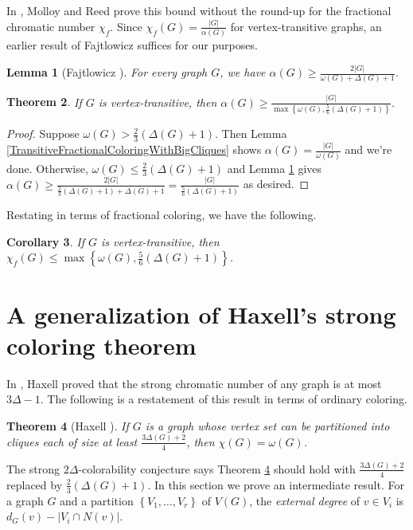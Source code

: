 \documentclass[12pt]{article}
\theoremstyle{plain}
\newtheorem{thm}{Theorem}[section]
\newtheorem{lem}[thm]{Lemma}
\newtheorem{cor}[thm]{Corollary}
\theoremstyle{definition}
\theoremstyle{remark}
\newcommand{\set}[1]{\left\{ #1 \right\}}
\newcommand{\card}[1]{\left|#1\right|}
\newcommand{\parens}[1]{\left( #1 \right)}
\begin{document}
In \cite{molloy2002graph}, Molloy and Reed prove this bound without the round-up for the fractional chromatic number $\chi_f$.  
Since $\chi_f(G) = \frac{|G|}{\alpha(G)}$ for vertex-transitive graphs, an earlier result of Fajtlowicz \cite{fajtlowicz1984independence} suffices for our purposes.

\begin{lem}[Fajtlowicz \cite{fajtlowicz1984independence}]\label{fajtlowicz}
For every graph $G$, we have $\alpha(G) \ge \frac{2|G|}{\omega(G) + \Delta(G) + 1}$.
\end{lem}

\begin{thm}
If $G$ is vertex-transitive, then $\alpha(G) \ge \frac{|G|}{\max\set{\omega(G), \frac56\parens{\Delta(G) + 1}}}$.
\end{thm}
\begin{proof}
Suppose $\omega(G) > \frac23 \parens{\Delta(G) + 1}$.  Then Lemma \ref{TransitiveFractionalColoringWithBigCliques} shows $\alpha(G) = \frac{|G|}{\omega(G)}$ and we're done.  Otherwise, $\omega(G) \le \frac23 \parens{\Delta(G) + 1}$ and Lemma \ref{fajtlowicz} gives $\alpha(G) \ge \frac{2|G|}{\frac23 (\Delta(G) + 1) + \Delta(G) + 1} = \frac{|G|}{\frac56 (\Delta(G) + 1)}$ as desired.
\end{proof}

Restating in terms of fractional coloring, we have the following.

\begin{cor}
If $G$ is vertex-transitive, then $\chi_f(G) \le \max\set{\omega(G), \frac56\parens{\Delta(G) + 1}}$.
\end{cor}
\section{A generalization of Haxell's strong coloring theorem}
In \cite{haxell2004strong}, Haxell proved that the strong chromatic number of any graph is at most $3\Delta - 1$.  The following is a restatement of this result in terms of ordinary coloring.
\begin{thm}[Haxell \cite{haxell2004strong}]\label{HaxellStrong}
If $G$ is a graph whose vertex set can be partitioned into cliques each of size at least $\frac{3\Delta(G) + 2}{4}$, then $\chi(G) = \omega(G)$.
\end{thm}

The strong $2\Delta$-colorability conjecture \cite{aharoni2007independent} says Theorem \ref{HaxellStrong} should hold with $\frac{3\Delta(G) + 2}{4}$ replaced by $\frac23 \parens{\Delta(G) + 1}$.  In this section we prove an intermediate result.  For a graph $G$ and a partition $\set{V_1, \ldots, V_r}$ of $V(G)$, the \emph{external degree} of $v \in V_i$ is $d_G(v) - \card{V_i \cap N(v)}$.
\end{document}
